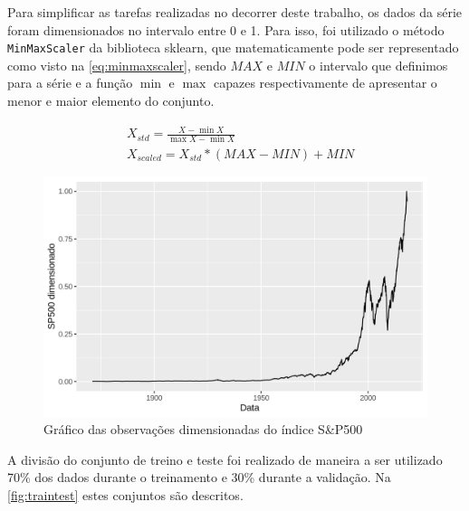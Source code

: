\documentclass[
    12pt,
    oneside,
    a4paper,
    english,
    brazil
]{abntex2}
\begin{document}
Para simplificar as tarefas realizadas no  decorrer deste trabalho, os dados da
série foram dimensionados no intervalo entre 0  e 1. Para isso, foi utilizado o
método \texttt{MinMaxScaler}  da biblioteca  sklearn, que  matematicamente pode
ser representado como visto na \autoref{eq:minmaxscaler}, sendo $MAX$ e $MIN$ o
intervalo  que definimos  para  a série  e  a função  $\min$  e $\max$  capazes
respectivamente de apresentar o menor e maior elemento do conjunto.

\begin{equation}
    \begin{split}\label{eq:minmaxscaler}
        &X_{std} = \frac{X - \min X}{\max X-\min X}\\
        &X_{scaled} = X_{std} * (MAX-MIN)+MIN
    \end{split}
\end{equation}

\begin{figure}[ht]
    \centering
    \caption{Gráfico das observações dimensionadas do índice S\&P500}\label{fig:sp500}
    \includegraphics[width=.5\linewidth]{images/SP500.png}
\end{figure}

A  divisão do  conjunto  de treino  e  teste  foi realizado  de  maneira a  ser
utilizado 70\% dos  dados durante o treinamento e 30\%  durante a validação. Na
\autoref{fig:traintest} estes conjuntos são descritos.
\end{document}
